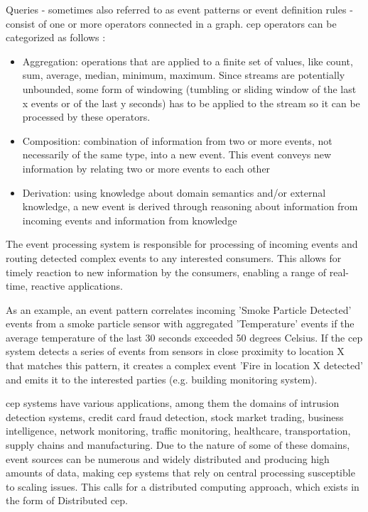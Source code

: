 Queries - sometimes also referred to as event patterns \cite{Luckham2011a} or event definition rules \cite{Cugola2013} - consist of one or more operators connected in a graph. \gls{cep} operators can be categorized as follows \cite{Freudenreich2015}:
\begin{itemize}
\item Aggregation: operations that are applied to a finite set of values, like count, sum, average, median, minimum, maximum. Since streams are potentially unbounded, some form of windowing (tumbling or sliding window of the last x events or of the last y seconds) has to be applied to the stream so it can be processed by these operators.
\item Composition: combination of information from two or more events, not necessarily of the same type, into a new event. This event conveys new information by relating two or more events to each other
\item Derivation: using knowledge about domain semantics and/or external knowledge, a new event is derived through reasoning about information from incoming events and information from knowledge
\end{itemize}

The event processing system is responsible for processing of incoming events and routing detected complex events to any interested consumers.
This allows for timely reaction to new information by the consumers, enabling a range of real-time, reactive applications.

As an example, an event pattern correlates incoming 'Smoke Particle Detected' events from a smoke particle sensor with aggregated 'Temperature' events if the average temperature of the last 30 seconds exceeded 50 degrees Celsius. If the \gls{cep} system detects a series of events from sensors in close proximity to location X that matches this pattern, it creates a complex event 'Fire in location X detected' and emits it to the interested parties (e.g. building monitoring system). 

\gls{cep} systems have various applications, among them the  domains of intrusion detection systems, credit card fraud detection, stock market trading, business intelligence, network monitoring, traffic monitoring, healthcare, transportation, supply chains and manufacturing. Due to the nature of some of these domains, event sources can be numerous and widely distributed and producing high amounts of data, making \gls{cep} systems that rely on central processing susceptible to scaling issues. This calls for a distributed computing approach, which exists in the form of Distributed \gls{cep}.

